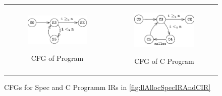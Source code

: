 \begin{figure}[H]
\begin{tabular}{cc}
\begin{subfigure}[b]{0.5\textwidth}
\begin{center}
{\includegraphics[scale=1.3]{chapters/figures/figMallocSpecCfg.pdf}}
\vspace{10pt}
\end{center}
\vspace{-15px}
\caption{\label{fig:llAllocSpecIRCFG}CFG of \SpecL{} Program}
\end{subfigure}%
&
\begin{subfigure}[b]{0.5\textwidth}
\begin{center}
{\includegraphics[scale=1.3]{chapters/figures/figMallocCCfg.pdf}}
\end{center}
\vspace{-15px}
\caption{\label{fig:llAllocCCFG}CFG of C Program}
\end{subfigure}%
\\
\end{tabular}
\caption{\label{fig:mallocSpecCFGAndCCFG}CFGs for Spec and C Programm IRs in \cref{fig:llAllocSpecIRAndCIR}}
\end{figure}
